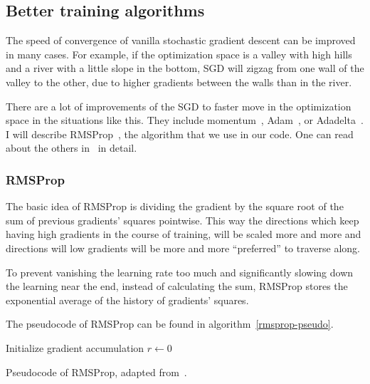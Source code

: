 \subsection{Better training algorithms}
The speed of convergence of vanilla stochastic gradient descent can be improved in many cases. For example, if the optimization space is a valley with high hills and a river with a little slope in the bottom, SGD will zigzag from one wall of the valley to the other, due to higher gradients between the walls than in the river. 

There are a lot of improvements of the SGD to faster move in the optimization space in the situations like this. They include momentum~\cite{momentum}, Adam~\cite{adam}, or Adadelta~\cite{adadelta}. I will describe RMSProp~\cite{rmsprop}, the algorithm that we use in our code. One can read about the others in~\cite[chapter 8.3.]{dlbook} in detail.

\subsubsection{RMSProp}\label{rmsprop-section}
The basic idea of RMSProp is dividing the gradient by the square root of the sum of previous gradients' squares pointwise. This way the directions which keep having high gradients in the course of training, will be scaled more and more and directions will low gradients will be more and more ``preferred'' to traverse along.

To prevent vanishing the learning rate too much and significantly slowing down the learning near the end, instead of calculating the sum, RMSProp stores the exponential average of the history of gradients' squares.

The pseudocode of RMSProp can be found in algorithm~\ref{rmsprop-pseudo}.
\begin{algorithm}
  \DontPrintSemicolon
  Initialize gradient accumulation $r \leftarrow 0$\;
  \caption{Pseudocode of RMSProp, adapted from~\cite{dlbook}.}\label{rmsprop-pseudo}
\end{algorithm}

